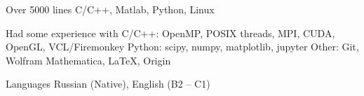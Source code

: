

\begin{cvskills}

  \cvskill
    {Over 5000 lines} %
    {C/C++, Matlab, Python, Linux} %

  \cvskill
    {Had some experience with} %
    {\newline C/C++: OpenMP, POSIX threads, MPI, CUDA, OpenGL, VCL/Firemonkey \newline Python: scipy, numpy, matplotlib, jupyter \newline Other: Git, Wolfram Mathematica, \LaTeX, Origin \newline} %

  \cvskill
    {Languages} %
    {Russian (Native), English (B2 -- C1)} %

\end{cvskills}
